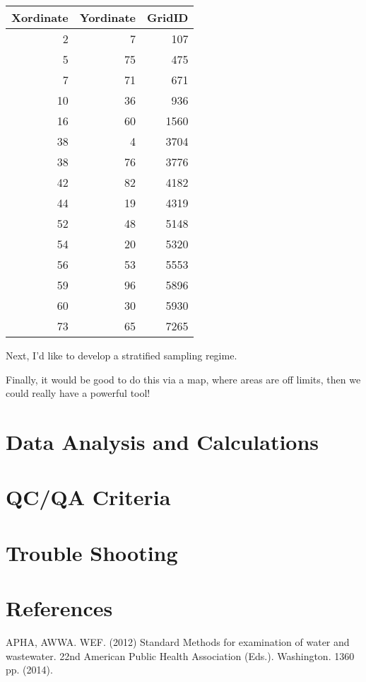 \documentclass[12pt]{../SOP3_beta}\usepackage[]{graphicx}\usepackage[]{color}
\begin{document}
\begin{table}[ht]
\centering
\begin{tabular}{rrr}
  \hline
Xordinate & Yordinate & GridID \\ 
  \hline
  2 &   7 & 107 \\ 
    5 &  75 & 475 \\ 
    7 &  71 & 671 \\ 
   10 &  36 & 936 \\ 
   16 &  60 & 1560 \\ 
   38 &   4 & 3704 \\ 
   38 &  76 & 3776 \\ 
   42 &  82 & 4182 \\ 
   44 &  19 & 4319 \\ 
   52 &  48 & 5148 \\ 
   54 &  20 & 5320 \\ 
   56 &  53 & 5553 \\ 
   59 &  96 & 5896 \\ 
   60 &  30 & 5930 \\ 
   73 &  65 & 7265 \\ 
   \hline
\end{tabular}
\end{table}


\NP Next, I'd like to develop a stratified sampling regime.

\NP Finally, it would be good to do this via a map, where areas are off limits, then we could really have a powerful tool!

\section{Data Analysis and Calculations}

\section{QC/QA Criteria}

\section{Trouble Shooting}

\section{References}

\NP APHA, AWWA. WEF. (2012) Standard Methods for examination of water and wastewater. 22nd American Public Health Association (Eds.). Washington. 1360 pp. (2014).
\end{document}
